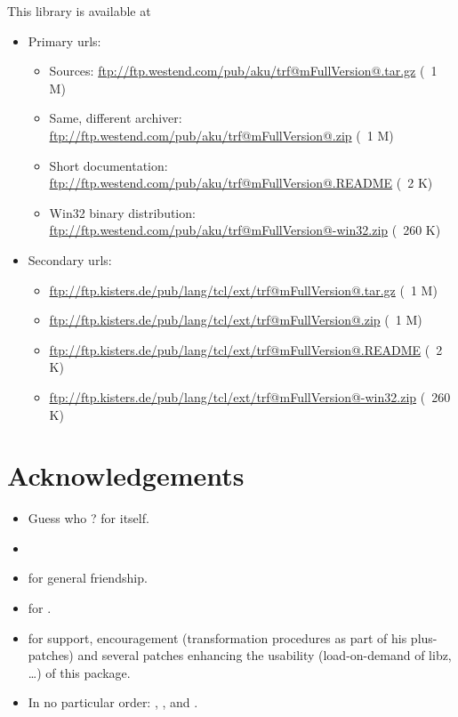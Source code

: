 \documentclass {report}
\begin{document}
This library is available at
\begin {itemize}
\item[] Primary urls:
\begin {itemize}
\item[Sources:]			  \url {ftp://ftp.westend.com/pub/aku/trf@mFullVersion@.tar.gz} (~1 M)
\item[Same, different archiver:]  \url {ftp://ftp.westend.com/pub/aku/trf@mFullVersion@.zip}    (~1 M)
\item[Short documentation:]	  \url {ftp://ftp.westend.com/pub/aku/trf@mFullVersion@.README} (~2 K)
\item[Win32 binary distribution:] \url {ftp://ftp.westend.com/pub/aku/trf@mFullVersion@-win32.zip} (~260 K)
\end {itemize}

\item[] Secondary urls:
\begin {itemize}
	\item \url {ftp://ftp.kisters.de/pub/lang/tcl/ext/trf@mFullVersion@.tar.gz} (~1 M)
	\item \url {ftp://ftp.kisters.de/pub/lang/tcl/ext/trf@mFullVersion@.zip}    (~1 M)
	\item \url {ftp://ftp.kisters.de/pub/lang/tcl/ext/trf@mFullVersion@.README} (~2 K)
	\item \url {ftp://ftp.kisters.de/pub/lang/tcl/ext/trf@mFullVersion@-win32.zip} (~260 K)
\end {itemize}
\end {itemize}


\chapter {Acknowledgements}

\begin {itemize}\Large
\item	Guess who ? \jo{} for \tcl {} itself. 
\item	\jyl
\item	\bast{} for general friendship.
\item	\greyham{} for .
\item	\jan{} for support, encouragement
	(transformation procedures as part of his plus-patches) and
	several patches enhancing the usability (load-on-demand of
	libz, \dots{}) of this package.
\item	In no particular order: \gookkimn{}, \rvaldez{}, \gvvaughan{}
	and \fmeyer{}.
\end   {itemize}
\end{document}
